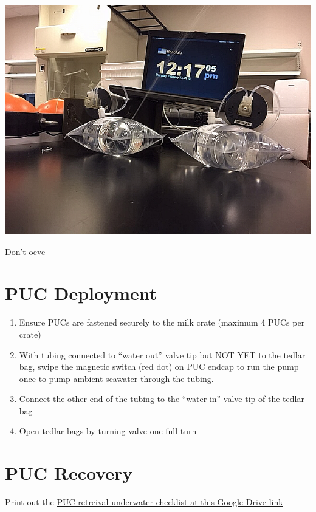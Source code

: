 \documentclass[]{book}
\providecommand{\tightlist}{%
  \setlength{\itemsep}{0pt}\setlength{\parskip}{0pt}}
\begin{document}
\includegraphics{images/PUC_bag_pop.png}

Don't oeve

\hypertarget{puc-deployment}{%
\section{PUC Deployment}\label{puc-deployment}}

\begin{enumerate}
\def\labelenumi{\arabic{enumi}.}
\tightlist
\item
  Ensure PUCs are fastened securely to the milk crate (maximum 4 PUCs per crate)
\item
  With tubing connected to ``water out'' valve tip but NOT YET to the tedlar bag, swipe the magnetic switch (red dot) on PUC endcap to run the pump once to pump ambient seawater through the tubing.
\item
  Connect the other end of the tubing to the ``water in'' valve tip of the tedlar bag
\item
  Open tedlar bags by turning valve one full turn
\end{enumerate}

\hypertarget{puc-recovery}{%
\section{PUC Recovery}\label{puc-recovery}}

Print out the \href{https://drive.google.com/drive/folders/1X6fAG4OIDs66Ji5xzYsX8JySqhkSs5k-}{PUC retreival underwater checklist at this Google Drive link}
\end{document}
